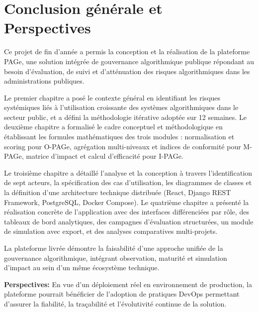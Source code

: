 \chapter*{Conclusion générale et Perspectives}

Ce projet de fin d'année a permis la conception et la réalisation de la plateforme PAGe, une solution intégrée de gouvernance algorithmique publique répondant au besoin d'évaluation, de suivi et d'atténuation des risques algorithmiques dans les administrations publiques.

Le premier chapitre a posé le contexte général en identifiant les risques systémiques liés à l'utilisation croissante des systèmes algorithmiques dans le secteur public, et a défini la méthodologie itérative adoptée sur 12 semaines. Le deuxième chapitre a formalisé le cadre conceptuel et méthodologique en établissant les formules mathématiques des trois modules : normalisation et scoring pour O-PAGe, agrégation multi-niveaux et indices de conformité pour M-PAGe, matrice d'impact et calcul d'efficacité pour I-PAGe.

Le troisième chapitre a détaillé l'analyse et la conception à travers l'identification de sept acteurs, la spécification des cas d'utilisation, les diagrammes de classes et la définition d'une architecture technique distribuée (React, Django REST Framework, PostgreSQL, Docker Compose). Le quatrième chapitre a présenté la réalisation concrète de l'application avec des interfaces différenciées par rôle, des tableaux de bord analytiques, des campagnes d'évaluation structurées, un module de simulation avec export, et des analyses comparatives multi-projets.

La plateforme livrée démontre la faisabilité d'une approche unifiée de la gouvernance algorithmique, intégrant observation, maturité et simulation d'impact au sein d'un même écosystème technique.

\vspace{0.3cm}
\noindent\textbf{Perspectives:} En vue d'un déploiement réel en environnement de production, la plateforme pourrait bénéficier de l'adoption de pratiques DevOps permettant d'assurer la fiabilité, la traçabilité et l'évolutivité continue de la solution.
